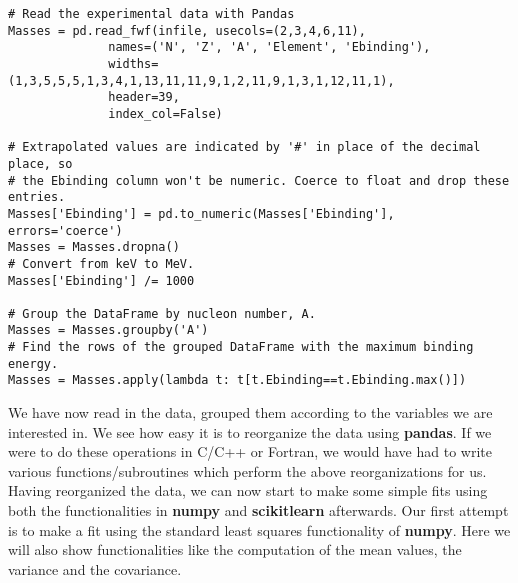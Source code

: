 \documentclass[%
oneside,                 %
final,                   %
10pt]{article}
\begin{document}
\begin{verbatim}
# Read the experimental data with Pandas
Masses = pd.read_fwf(infile, usecols=(2,3,4,6,11),
              names=('N', 'Z', 'A', 'Element', 'Ebinding'),
              widths=(1,3,5,5,5,1,3,4,1,13,11,11,9,1,2,11,9,1,3,1,12,11,1),
              header=39,
              index_col=False)

# Extrapolated values are indicated by '#' in place of the decimal place, so
# the Ebinding column won't be numeric. Coerce to float and drop these entries.
Masses['Ebinding'] = pd.to_numeric(Masses['Ebinding'], errors='coerce')
Masses = Masses.dropna()
# Convert from keV to MeV.
Masses['Ebinding'] /= 1000

# Group the DataFrame by nucleon number, A.
Masses = Masses.groupby('A')
# Find the rows of the grouped DataFrame with the maximum binding energy.
Masses = Masses.apply(lambda t: t[t.Ebinding==t.Ebinding.max()])
\end{verbatim}

We have now read in the data, grouped them according to the variables we are interested in. 
We see how easy it is to reorganize the data using \textbf{pandas}. If we
were to do these operations in C/C++ or Fortran, we would have had to
write various functions/subroutines which perform the above
reorganizations for us.  Having reorganized the data, we can now start
to make some simple fits using both the functionalities in \textbf{numpy} and
\textbf{scikitlearn} afterwards. Our first attempt is to make a fit using the
standard least squares functionality of \textbf{numpy}. Here we will also
show functionalities like the computation of the mean values, the
variance and the covariance. 
\end{document}
